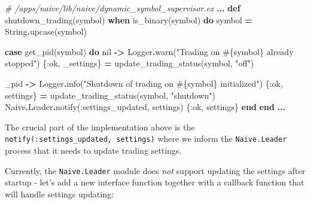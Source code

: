 \documentclass[
]{book}
\newenvironment{Shaded}{\begin{snugshade}}{\end{snugshade}}
\newcommand{\CommentTok}[1]{\textcolor[rgb]{0.56,0.35,0.01}{\textit{#1}}}
\newcommand{\ConstantTok}[1]{\textcolor[rgb]{0.00,0.00,0.00}{#1}}
\newcommand{\KeywordTok}[1]{\textcolor[rgb]{0.13,0.29,0.53}{\textbf{#1}}}
\newcommand{\NormalTok}[1]{#1}
\newcommand{\OperatorTok}[1]{\textcolor[rgb]{0.81,0.36,0.00}{\textbf{#1}}}
\newcommand{\OtherTok}[1]{\textcolor[rgb]{0.56,0.35,0.01}{#1}}
\newcommand{\StringTok}[1]{\textcolor[rgb]{0.31,0.60,0.02}{#1}}
\newcommand{\VariableTok}[1]{\textcolor[rgb]{0.00,0.00,0.00}{#1}}
\begin{document}
\begin{Shaded}
\begin{Highlighting}[]
\CommentTok{\# /apps/naive/lib/naive/dynamic\_symbol\_supervisor.ex}
  \OperatorTok{...}
  \KeywordTok{def}\NormalTok{ shutdown\_trading(symbol) }\KeywordTok{when}\NormalTok{ is\_binary(symbol) }\KeywordTok{do}
\NormalTok{    symbol }\OperatorTok{=} \ConstantTok{String}\OperatorTok{.}\NormalTok{upcase(symbol)}

    \KeywordTok{case}\NormalTok{ get\_pid(symbol) }\KeywordTok{do}
      \ConstantTok{nil} \OperatorTok{{-}\textgreater{}}
        \ConstantTok{Logger}\OperatorTok{.}\NormalTok{warn(}\StringTok{"Trading on }\OtherTok{\#\{}\NormalTok{symbol}\OtherTok{\}}\StringTok{ already stopped"}\NormalTok{)}
\NormalTok{        \{}\VariableTok{:ok}\NormalTok{, \_settings\} }\OperatorTok{=}\NormalTok{ update\_trading\_status(symbol, }\StringTok{"off"}\NormalTok{)}

\NormalTok{      \_pid }\OperatorTok{{-}\textgreater{}}
        \ConstantTok{Logger}\OperatorTok{.}\NormalTok{info(}\StringTok{"Shutdown of trading on }\OtherTok{\#\{}\NormalTok{symbol}\OtherTok{\}}\StringTok{ initialized"}\NormalTok{)}
\NormalTok{        \{}\VariableTok{:ok}\NormalTok{, settings\} }\OperatorTok{=}\NormalTok{ update\_trading\_status(symbol, }\StringTok{"shutdown"}\NormalTok{)}
        \ConstantTok{Naive}\OperatorTok{.}\ConstantTok{Leader}\OperatorTok{.}\NormalTok{notify(}\VariableTok{:settings\_updated}\NormalTok{, settings)}
\NormalTok{        \{}\VariableTok{:ok}\NormalTok{, settings\}}
    \KeywordTok{end}
  \KeywordTok{end}
  \OperatorTok{...}
\end{Highlighting}
\end{Shaded}

The crucial part of the implementation above is the \texttt{notify(:settings\_updated,\ settings)} where we inform the \texttt{Naive.Leader} process that it needs to update trading settings.

Currently, the \texttt{Naive.Leader} module does \emph{not} support updating the settings after startup - let's add a new interface function together with a callback function that will handle settings updating:
\end{document}
